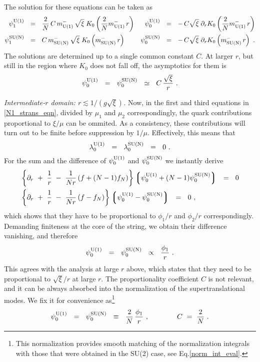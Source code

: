 \documentclass{article}
\newcommand{\p}{\partial}
\newcommand{\lgr}{\left\lgroup}
\newcommand{\rgr}{\right\rgroup}
\newcommand{\mUm}{m_{\rm U(1)}^{-}}
\newcommand{\mNm}{m_{\rm SU(N)}^{-}}
\begin{document}
The solution for these equations can be taken as
\begin{align*}
%
	\plU & ~~=~~ \frac{2}{N}\,C\,\mUm\,\sqrt{\xi}\;K_0\left(\frac{2}{N}\mUm\,r\right)  
&
	\poU & ~~=~~ -\,C\sqrt{\xi}\; \p_r K_0\left(\frac{2}{N}\mUm\,r\right)
\\
%
	\plN & ~~=~~ C\,\mNm\,\sqrt{\xi}\; K_0\left(\mNm\, r\right)
&
	\poN & ~~=~~ -\,C\sqrt{\xi}\; \p_r K_0\left(\mNm\,r\right)~.
\end{align*}
The solutions are determined up to a single common constant $ C $.
At larger $ r $, but still in the region where $K_0$ does not fall off, the asymptotics for them is
\[
	\psi_0^{\rm U(1)} ~~=~~ \psi_0^{\rm SU(N)} ~~\simeq~~ C\,\frac{\sqrt{\xi}}{r}~.
\]

{\it Intermediate-$r$ domain: $ r \lesssim 1/(g\sqrt{\xi}) $.} 
Now, in the first and third equations in \eqref{N1_strans_eqn}, divided by $ \mu_1 $ and $ \mu_2 $ correspondingly,
the quark contributions proportional to $ \xi/\mu $ can be ommited.
As a consistency, these contributions will turn out to be finite before suppression by $ 1/\mu $.
Effectively, this means that
\[
	\lambda_0^{\rm U(1)} ~~=~~ \lambda_0^{\rm SU(N)} ~~=~~ 0~.
\]
For the sum and the difference of $ \psi_0^{\rm U(1)} $ and $ \psi_0^{\rm SU(N)} $ we instantly derive
\begin{align*}
%
&
	\left\{ \p_r ~+~ \frac{1}{r} ~-~ \frac{1}{Nr}\left(f + (N-1)f_N\right)\right\}
		\lgr \poU  + (N-1) \poN \rgr  ~~=~~ 0 
	\\
%
&
	\left\{ \p_r ~+~ \frac{1}{r} ~-~ \frac{1}{Nr}\left(f - f_N\right)\right\}
		\lgr \poU - \poN \rgr ~~=~~ 0~,
\end{align*}
which shows that they have to be proportional to $ \phi_1/r $ and $ \phi_2/r $ correspondingly.
Demanding finiteness at the core of the string, we obtain their difference vanishing, and therefore
\[
	\psi_0^{\rm U(1)} ~~=~~ \psi_0^{\rm SU(N)} ~~\propto~~ \frac{\phi_1}{r}~.
\]
This agrees with the analysis at large $ r $ above, which states that they need to be proportional
to $ \sqrt{\xi}/r $ at large $ r $.
The proportionality coefficient $ C $ is not relevant, and it can be always absorbed into the normalization
of the supertranslational modes.
We fix it for convenience as\footnote{This normalization provides smooth matching of the normalization
integrals with those that were obtained in the SU(2) case, see Eq.\eqref{norm_int_eval}.}
\begin{equation}
\label{tail_strans}
	\psi_0^{\rm U(1)} ~~=~~ \psi_0^{\rm SU(N)} ~~\equiv~~ \frac{2}{N}\, \frac{\phi_1}{r}~, \qquad\qquad  C ~=~ \frac{2}{N}~.
\end{equation}
\end{document}
